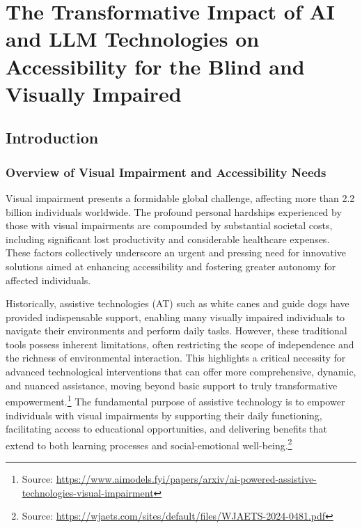 \chapter{The Transformative Impact of AI and LLM Technologies on Accessibility for the Blind and Visually Impaired}
\label{chap:ai-llm-accessibility}

\section{Introduction}
\label{sec:introduction}

\subsection{Overview of Visual Impairment and Accessibility Needs}

Visual impairment presents a formidable global challenge, affecting more than 2.2 billion individuals worldwide. The profound personal hardships experienced by those with visual impairments are compounded by substantial societal costs, including significant lost productivity and considerable healthcare expenses. These factors collectively underscore an urgent and pressing need for innovative solutions aimed at enhancing accessibility and fostering greater autonomy for affected individuals.\cite{arxiv_visual_impairment}

Historically, assistive technologies (AT) such as white canes and guide dogs have provided indispensable support, enabling many visually impaired individuals to navigate their environments and perform daily tasks. However, these traditional tools possess inherent limitations, often restricting the scope of independence and the richness of environmental interaction. This highlights a critical necessity for advanced technological interventions that can offer more comprehensive, dynamic, and nuanced assistance, moving beyond basic support to truly transformative empowerment.\footnote{Source: \url{https://www.aimodels.fyi/papers/arxiv/ai-powered-assistive-technologies-visual-impairment}} The fundamental purpose of assistive technology is to empower individuals with visual impairments by supporting their daily functioning, facilitating access to educational opportunities, and delivering benefits that extend to both learning processes and social-emotional well-being.\footnote{Source: \url{https://wjaets.com/sites/default/files/WJAETS-2024-0481.pdf}}


